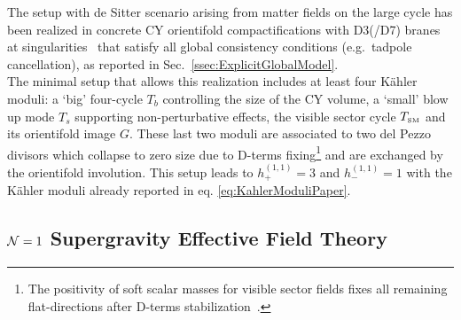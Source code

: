 \documentclass[12pt,a4paper]{book}
\def\SM{{\scriptscriptstyle \rm SM}}
\begin{document}
The setup with de Sitter scenario arising from matter fields on the large cycle has been realized in concrete CY orientifold compactifications with D3(/D7) branes at singularities~\cite{Cicoli:2013mpa,Cicoli:2012vw,Cicoli:2013cha} that satisfy all global consistency conditions (e.g.~tadpole cancellation), as reported in Sec.~\ref{ssec:ExplicitGlobalModel}.\\ 

The minimal setup that allows this realization includes at least four K\"ahler moduli: a `big' four-cycle $T_b$ controlling the size of the CY volume, a `small' blow up mode $T_s$ supporting non-perturbative effects, the visible sector cycle $T_\SM$ and its orientifold image $G$. These last two moduli are associated to two del Pezzo divisors which collapse to zero size due to D-terms fixing\footnote{The positivity of soft scalar masses for visible sector fields fixes all remaining flat-directions after D-terms stabilization~\cite{Cicoli:2012vw}.} and are exchanged by the orientifold involution. This setup leads to $h^{(1,1)}_+ = 3$ and $h^{(1,1)}_- = 1$ with the K\"ahler moduli already reported in eq. \eqref{eq:KahlerModuliPaper}.

\subsection*{${\cal N} = 1$ Supergravity Effective Field Theory}
\end{document}
